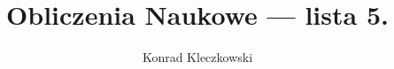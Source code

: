 \documentclass{mwrep}
\title{Obliczenia Naukowe --- lista 5.}
\author{Konrad Kleczkowski}
\begin{document}
  \maketitle
  \tableofcontents

  \listofalgorithms
  \listoffigures
  \listoftables
\end{document}
